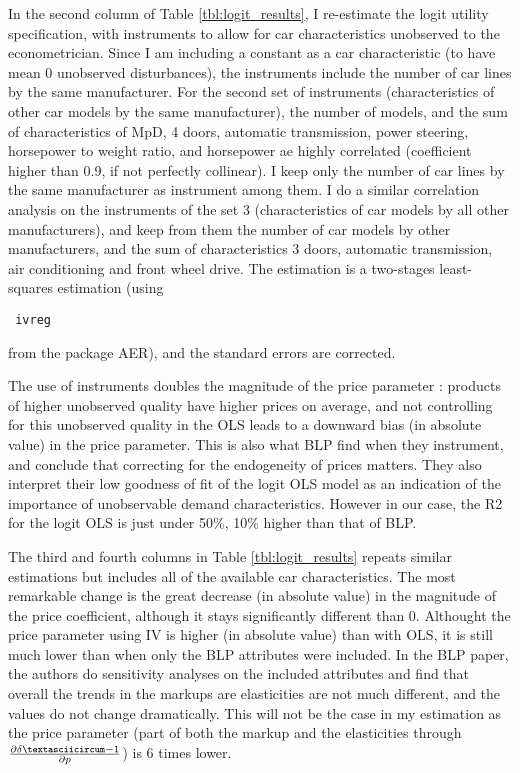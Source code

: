 \documentclass{article}\usepackage[]{graphicx}\usepackage[]{color}
\begin{document}
In the second column of Table \ref{tbl:logit_results}, I re-estimate the logit utility specification, with instruments to allow for car characteristics unobserved to the econometrician. Since I am including a constant as a car characteristic (to have mean 0 unobserved disturbances), the instruments include the number of car lines by the same manufacturer.  For the second set of instruments (characteristics of other car models by the same manufacturer), the number of models, and the sum of characteristics of MpD, 4 doors, automatic transmission, power steering, horsepower to weight ratio, and horsepower ae highly correlated (coefficient higher than 0.9, if not perfectly collinear). I keep only the number of car lines by the same manufacturer as instrument among them. I do a similar correlation analysis on the instruments of the set 3 (characteristics of car models by all other manufacturers), and keep from them the number of car models by other manufacturers, and the sum of characteristics 3 doors, automatic transmission, air conditioning and front wheel drive. The estimation is a two-stages least-squares estimation (using \begin{verbatim} ivreg \end{verbatim} from the package AER), and the standard errors are corrected.

The use of instruments doubles the magnitude of the price parameter : products of higher unobserved quality have higher prices on average, and not controlling for this unobserved quality in the OLS leads to a downward bias (in absolute value) in the price parameter. This is also what BLP find when they instrument, and conclude that correcting for the endogeneity of prices matters. They also interpret their low goodness of fit of the logit OLS model as an indication of the importance of unobservable demand characteristics. However in our case, the R2 for the logit OLS is just under 50\%, 10\% higher than that of BLP.

The third and fourth columns in Table \ref{tbl:logit_results} repeats similar estimations but includes all of the available car characteristics. The most remarkable change is the great decrease (in absolute value) in the magnitude of the price coefficient, although it stays significantly different than 0. Althought the price parameter using IV is higher (in absolute value) than with OLS, it is still much lower than when only the BLP attributes were included. In the BLP paper, the authors do sensitivity analyses on the included attributes and find that overall the trends in the markups are elasticities are not much different, and the values do not change dramatically. This will not be the case in my estimation as the price parameter (part of both the markup and the elasticities through $\frac{\partial \deltaˆ{-1}}{\partial p}$) is 6 times lower.
\end{document}
